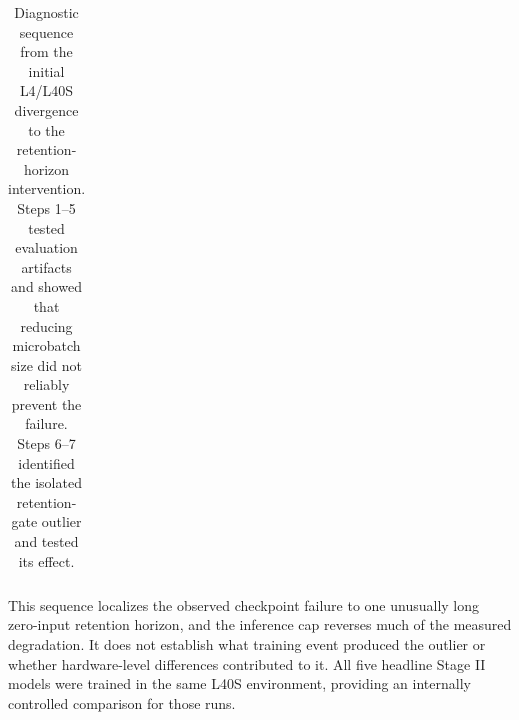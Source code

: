 \begin{table}[!ht]
\begin{tabular}{>{\raggedright\arraybackslash}p{0.20\linewidth}>{\raggedright\arraybackslash}p{0.36\linewidth}>{\raggedright\arraybackslash}p{0.38\linewidth}}
\bottomrule
\end{tabular}
\caption{Diagnostic sequence from the initial L4/L40S divergence to the retention-horizon intervention. Steps 1--5 tested evaluation artifacts and showed that reducing microbatch size did not reliably prevent the failure. Steps 6--7 identified the isolated retention-gate outlier and tested its effect.}
\label{table:environment_diagnostic_journey}
\end{table}

This sequence localizes the observed checkpoint failure to one unusually long zero-input retention horizon, and the inference cap reverses much of the measured degradation. It does not establish what training event produced the outlier or whether hardware-level differences contributed to it. All five headline Stage II models were trained in the same L40S environment, providing an internally controlled comparison for those runs.
